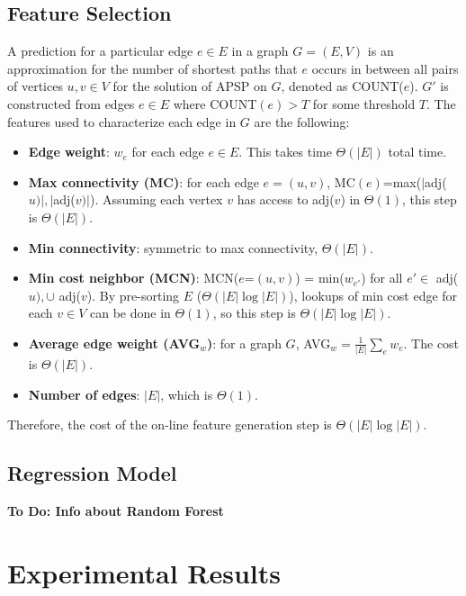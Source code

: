 \documentclass[journal]{IEEEtran}
\begin{document}
\subsection{Feature Selection}
	A prediction for a particular edge $e\in E$ in a graph $G=(E,V)$ 
	is an approximation for the number of shortest paths 
	that $e$ occurs in between all pairs of vertices $u,v\in V$ for the solution of APSP on $G$, denoted as 
	COUNT($e$). $G'$ is constructed from edges $e\in E$ where COUNT$(e)>T$ for some threshold $T$. 
	The features used to characterize each edge in $G$ are the following:
	\begin{itemize}
		\item {\bf{Edge weight}}: $w_e$ for each edge $e\in E$. This takes time $\Theta(|E|)$ total time.
		\item{\bf{Max connectivity (MC)}}: for each edge $e=(u,v)$, MC$(e)$=max($|$adj($u)|,|$adj($v)|$).
			Assuming each vertex $v$ has access to adj($v$) in $\Theta(1)$, this step is $\Theta(|E|)$.
		\item{\bf{Min connectivity}}: symmetric to max connectivity, $\Theta(|E|)$. 
		\item{\bf{Min cost neighbor (MCN)}}: MCN($e$=$(u,v)$) = min($w_{e'}$) for all $e'\in$ adj($u),\cup$
			adj($v$). By pre-sorting $E$ ($\Theta(|E|\log|E|)$), lookups of min cost edge for each $v\in V$
			can be done in $\Theta(1)$, so this step is $\Theta(|E|\log|E|)$.
		\item{\bf{Average edge weight (AVG$_w$)}}: for a graph $G$, AVG$_w = \frac{1}{|E|}\sum_{e}w_e$.
			The cost is $\Theta(|E|)$.
		\item{\bf{Number of edges}}: $|E|$, which is $\Theta(1)$.
	\end{itemize}
	Therefore, the cost of the on-line feature generation step is $\Theta(|E|\log|E|)$.
	
\subsection{Regression Model}
	{\bf{To Do: Info about Random Forest}}
	
\section{Experimental Results}
\end{document}
